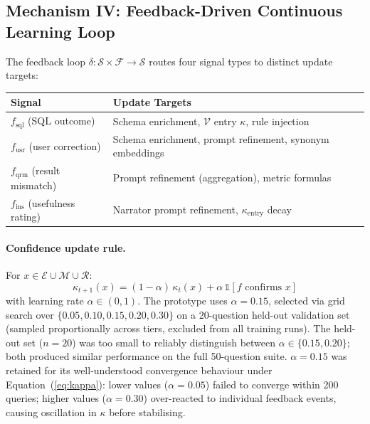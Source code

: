 \documentclass[11pt,a4paper]{article}
\begin{document}
\subsection{Mechanism IV: Feedback-Driven Continuous Learning Loop}\label{sec:mechanism4}

The feedback loop $\delta : \mathcal{S} \times \mathcal{F} \to \mathcal{S}$ routes
four signal types to distinct update targets:

\begin{center}
\small
\begin{tabular}{ll}
\toprule
\textbf{Signal} & \textbf{Update Targets} \\
\midrule
$f_\mathrm{sql}$ (SQL outcome)  & Schema enrichment, $\mathcal{V}$ entry $\kappa$, rule injection \\
$f_\mathrm{usr}$ (user correction) & Schema enrichment, prompt refinement, synonym embeddings \\
$f_\mathrm{qrm}$ (result mismatch) & Prompt refinement (aggregation), metric formulas \\
$f_\mathrm{ins}$ (usefulness rating) & Narrator prompt refinement, $\kappa_\mathrm{entry}$ decay \\
\bottomrule
\end{tabular}
\end{center}

\paragraph{Confidence update rule.}
For $x \in \mathcal{E} \cup \mathcal{M} \cup \mathcal{R}$:
\begin{equation}\label{eq:kappa}
  \kappa_{t+1}(x) = (1-\alpha)\,\kappa_t(x)
  + \alpha\,\mathbb{1}[f \text{ confirms } x]
\end{equation}
with learning rate $\alpha \in (0,1)$.  The prototype uses $\alpha = 0.15$,
selected via grid search over $\{0.05, 0.10, 0.15, 0.20, 0.30\}$ on a
20-question held-out validation set (sampled proportionally across tiers,
excluded from all training runs).  The held-out set ($n{=}20$) was too small to
reliably distinguish between $\alpha \in \{0.15, 0.20\}$; both produced similar
performance on the full 50-question suite.  $\alpha{=}0.15$ was retained for its
well-understood convergence behaviour under Equation~(\ref{eq:kappa}): lower
values ($\alpha{=}0.05$) failed to converge within 200 queries; higher values
($\alpha{=}0.30$) over-reacted to individual feedback events, causing oscillation
in $\kappa$ before stabilising.
\end{document}
